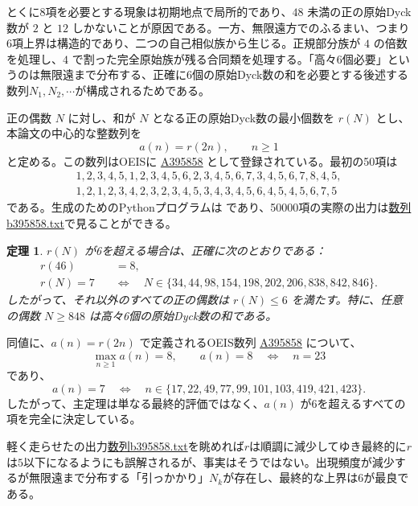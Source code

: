 \documentclass[12pt]{ltjsarticle}
\theoremstyle{plain}
\newtheorem{theorem}{定理}
\theoremstyle{definition}
\theoremstyle{plain}
\newcommand{\seqnum}[1]{\href{https://oeis.org/#1}{\textrm{\underline{#1}}}}
\begin{document}
とくに8項を必要とする現象は初期地点で局所的であり、$48$ 未満の正の原始Dyck数が $2$ と $12$ しかないことが原因である。一方、無限遠方でのふるまい、つまり6項上界は構造的であり、二つの自己相似族から生じる。正規部分族が $4$ の倍数を処理し、$4$ で割った完全原始族が残る合同類を処理する。「高々6個必要」というのは無限遠まで分布する、正確に6個の原始Dyck数の和を必要とする後述する数列$N_1, N_2, \cdots$が構成されるためである。

正の偶数 $N$ に対し、和が $N$ となる正の原始Dyck数の最小個数を $r(N)$ とし、本論文の中心的な整数列を
\[
        a(n)=r(2n),\qquad n\geq1
\]
と定める。この数列はOEISに \seqnum{A395858} \cite{OEIS-A395858} として登録されている。最初の50項は
\[
\begin{gathered}
1,2,3,4,5,1,2,3,4,5,6,2,3,4,5,6,7,3,4,5,6,7,8,4,5,\\
1,2,1,2,3,4,2,3,2,3,4,5,3,4,3,4,5,6,4,5,4,5,6,7,5
\end{gathered}
\]
である。生成のためのPythonプログラムは
\href{https://github.com/growupkuriyama-hub/lean_cfg_project/blob/3525cfb/LeanCfgProject/PrimDyck/A395858.py}{}であり、50000項の実際の出力は\href{https://github.com/growupkuriyama-hub/lean_cfg_project/blob/3525cfb/LeanCfgProject/PrimDyck/b395858.txt} {数列b395858.txt}で見ることができる。

\begin{theorem}\label{thm:classification}
$r(N)$ が6を超える場合は、正確に次のとおりである：
\[
\begin{aligned}
 r(46)&=8,\\[4pt]
 r(N)=7\quad&\Longleftrightarrow\quad
 N\in\{34,44,98,154,198,202,206,838,842,846\}.
\end{aligned}
\]
したがって、それ以外のすべての正の偶数は $r(N)\leq6$ を満たす。特に、任意の偶数 $N\geq848$ は高々6個の原始Dyck数の和である。
\end{theorem}

同値に、$a(n)=r(2n)$ で定義されるOEIS数列 \seqnum{A395858} \cite{OEIS-A395858} について、
\[
        \max_{n\geq1}a(n)=8,
        \qquad
        a(n)=8\quad\Longleftrightarrow\quad n=23
\]
であり、
\[
 a(n)=7
 \quad\Longleftrightarrow\quad
 n\in\{17,22,49,77,99,101,103,419,421,423\}.
\]
したがって、主定理は単なる最終的評価ではなく、$a(n)$ が6を超えるすべての項を完全に決定している。

軽く走らせたの出力\href{https://github.com/growupkuriyama-hub/lean_cfg_project/blob/3525cfb/LeanCfgProject/PrimDyck/b395858.txt} {数列b395858.txt}を眺めれば$r$は順調に減少してゆき最終的に$r$は$5$以下になるようにも誤解されるが、事実はそうではない。出現頻度が減少するが無限遠まで分布する「引っかかり」$N_k$が存在し、最終的な上界は6が最良である。
\end{document}
